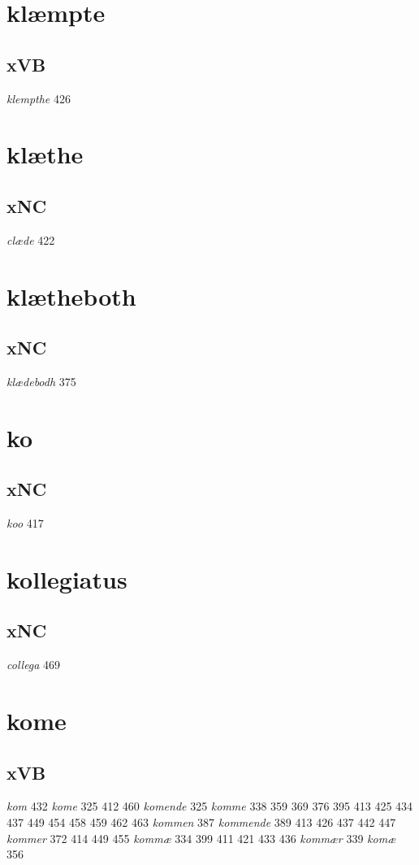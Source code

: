 \documentclass[a4paper,twocolumn]{article}
\begin{document}
\section{klæmpte}
\label{sec:orgc22ebeb}
\subsection{xVB}
\label{sec:org0aec38f}
\emph{klempthe} 426 
\section{klæthe}
\label{sec:org5fc3ffc}
\subsection{xNC}
\label{sec:org206b4fc}
\emph{clæde} 422 
\section{klætheboth}
\label{sec:orgd59c50f}
\subsection{xNC}
\label{sec:orgbc67ac1}
\emph{klædebodh} 375 
\section{ko}
\label{sec:orgf3799d5}
\subsection{xNC}
\label{sec:orgbd9109b}
\emph{koo} 417 
\section{kollegiatus}
\label{sec:orgf27d0fc}
\subsection{xNC}
\label{sec:org1d930f3}
\emph{collega} 469 
\section{kome}
\label{sec:orga5338e3}
\subsection{xVB}
\label{sec:org990ca2c}
\emph{kom} 432 \emph{kome} 325 412 460 \emph{komende} 325 \emph{komme} 338 359 369 376 395 413 425 434 437 449 454 458 459 462 463 \emph{kommen} 387 \emph{kommende} 389 413 426 437 442 447 \emph{kommer} 372 414 449 455 \emph{kommæ} 334 399 411 421 433 436 \emph{kommær} 339 \emph{komæ} 356 
\end{document}
